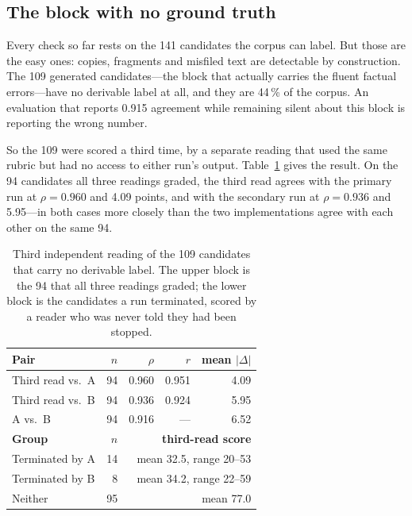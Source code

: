 \documentclass[conference]{IEEEtran}
\begin{document}
\subsection{The block with no ground truth}
Every check so far rests on the 141 candidates the corpus can label. But
those are the easy ones: copies, fragments and misfiled text are
detectable by construction. The 109 generated candidates---the block
that actually carries the fluent factual errors---have no derivable
label at all, and they are 44\,\% of the corpus. An evaluation that
reports 0.915 agreement while remaining silent about this block is
reporting the wrong number.

So the 109 were scored a third time, by a separate reading that used the
same rubric but had no access to either run's output.
Table~\ref{tab:third} gives the result. On the 94 candidates all three
readings graded, the third read agrees with the primary run at
$\rho = 0.960$ and 4.09 points, and with the secondary run at
$\rho = 0.936$ and 5.95---in both cases more closely than the two
implementations agree with each other on the same 94.

\begin{table}[t]
\caption{Third independent reading of the 109 candidates that carry no
derivable label. The upper block is the 94 that all three readings
graded; the lower block is the candidates a run terminated, scored by a
reader who was never told they had been stopped.}
\label{tab:third}
\centering\footnotesize
\begin{tabular}{@{}lrrrr@{}}
\toprule
\textbf{Pair} & \textbf{$n$} & \textbf{$\rho$} & \textbf{$r$} & \textbf{mean $|\Delta|$} \\
\midrule
Third read vs.\ A & 94 & 0.960 & 0.951 & 4.09 \\
Third read vs.\ B & 94 & 0.936 & 0.924 & 5.95 \\
A vs.\ B          & 94 & 0.916 & ---   & 6.52 \\
\midrule
\textbf{Group} & \textbf{$n$} & \multicolumn{3}{r}{\textbf{third-read score}} \\
\midrule
Terminated by A   & 14 & \multicolumn{3}{r}{mean 32.5, range 20--53} \\
Terminated by B   &  8 & \multicolumn{3}{r}{mean 34.2, range 22--59} \\
Neither           & 95 & \multicolumn{3}{r}{mean 77.0} \\
\bottomrule
\end{tabular}
\end{table}
\end{document}
